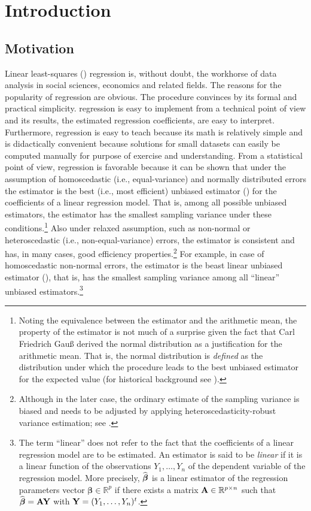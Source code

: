 \chapter{Introduction}
\label{chap:intro}

\section{Motivation}


Linear least-squares () regression is, without doubt, the workhorse of
data analysis in social sciences, economics and related fields. The reasons for
the popularity of  regression are obvious. The procedure convinces by
its formal and practical simplicity.  regression is easy to implement
from a technical point of view and its results, the estimated regression
coefficients, are easy to interpret. Furthermore,  regression is easy
to teach because its math is relatively simple and is didactically convenient
because  solutions for small datasets can easily be computed manually
for purpose of exercise and understanding. From a statistical point of view,
 regression is favorable because it can be shown that under the
assumption of homoscedastic (i.e., equal-variance) and normally distributed
errors the  estimator is the best (i.e., most efficient) unbiased
estimator () for the coefficients of a linear regression model. That
is, among all possible unbiased estimators, the  estimator has the
smallest sampling variance under these conditions.\footnote{Noting the
equivalence between the  estimator and the arithmetic mean, the
 property of the  estimator is not much of a surprise given
the fact that Carl Friedrich Gauß derived the normal distribution as a
justification for the arithmetic mean. That is, the normal distribution is
\emph{defined} as the distribution under which the  procedure leads to
the best unbiased estimator for the expected value (for historical background
see \citealp{huber72}).} Also under relaxed assumption, such as non-normal or
heteroscedastic (i.e., non-equal-variance) errors, the  estimator is
consistent and has, in many cases, good efficiency
properties.\footnote{Although in the later case, the ordinary  estimate
of the sampling variance is biased and needs to be adjusted by applying
heteroscedasticity-robust variance estimation; see \citealp{white80}.} For
example, in case of homoscedastic non-normal errors, the  estimator is
the beast linear unbiased estimator (), that is, has the smallest
sampling variance among all “linear” unbiased estimators.\footnote{The term
“linear” does not refer to the fact that the coefficients of a linear
regression model are to be estimated. An estimator is said to be \emph{linear}
if it is a linear function of the observations $Y_1,\ldots,Y_n$ of the
dependent variable of the regression model. More precisely,
$\widehat{\boldsymbol\beta}$ is a linear estimator of the regression parameters
vector $\boldsymbol\beta \in {\mathbb R}^p$ if there exists a matrix $\mathbf A
\in {\mathbb R}^{p \times n}$ such that
$\widehat{\boldsymbol\beta}=\mathbf A\mathbf Y$ with
$\mathbf Y=(Y_1,\ldots,Y_n)^t$.}

